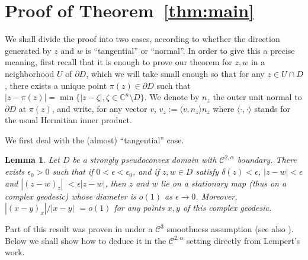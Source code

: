 \documentclass[a4paper,12pt]{amsart}
\newtheorem{lemma}[theorem]{Lemma}
\theoremstyle{remark}\newtheorem{remark}[theorem]{Remark}
\begin{document}
\section{Proof of Theorem~\ref{thm:main}}

We shall divide the proof into two cases, according to whether the direction generated by $z$ and $w$ is
``tangential'' or ``normal''. In order to give this a precise meaning, first recall that it is enough to 
prove our theorem for $z, w$ in a neighborhood $U$ of $\partial D$, which we will take small enough so that 
for any $z\in U\cap D$, there exists a unique point $\pi(z)\in \partial D$ such that $|z-\pi(z)|
= \min\{ |z-\zeta|, \zeta \in \mathbb C^n \setminus D\}$. We denote by $n_z$ the outer unit normal to 
$\partial D$ at $\pi(z)$, and write, for any vector $v$, $v_z:=\langle v,n_z\rangle n_z$ where $\langle \cdot, \cdot\rangle$ stands for the usual Hermitian inner product. 

We first deal with the (almost) ``tangential'' case.
\begin{lemma}\label{lem:eps}
Let $D$ be a strongly pseudoconvex domain with $\mathcal C^{2, \alpha}$ boun\-dary. There exists
$\epsilon_0>0$ such that if $0<\epsilon<\epsilon_0$, and if $z,w\in D$ satisfy $\delta(z)<\epsilon$, $|z-w|<\epsilon$ and $|(z-w)_z|$  $ < \epsilon |z-w|$, then $z$ and $w$ lie on a stationary map (thus on a complex geodesic) whose diameter is $o(1)$ as $\epsilon \to 0$. Moreover, $|(x-y)_x|/|x-y|$  $= o(1)$ for any points $x,y$ of this complex geodesic.
\end{lemma}

Part of this result was proven in \cite{BFW} under a $\mathcal C^3$ smoothness assumption (see also \cite{Kos}). Below we shall show how to deduce it in the $\mathcal C^{2,\alpha}$ setting directly from Lempert's work.
\end{document}
